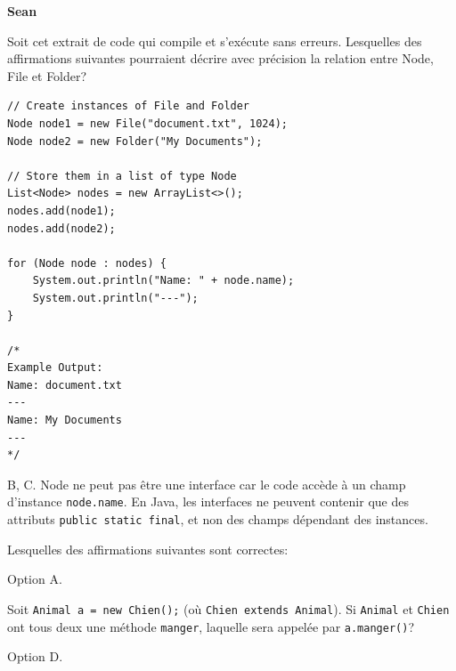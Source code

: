 \begin{Exercice}[5 minutes]\textbf{Sean}


Soit cet extrait de code qui compile et s'exécute sans erreurs. Lesquelles des affirmations suivantes pourraient décrire avec précision la relation entre Node, File et Folder?

\begin{lstlisting}[style=javastyle]
// Create instances of File and Folder
Node node1 = new File("document.txt", 1024);
Node node2 = new Folder("My Documents");

// Store them in a list of type Node
List<Node> nodes = new ArrayList<>();
nodes.add(node1);
nodes.add(node2);

for (Node node : nodes) {
    System.out.println("Name: " + node.name); 
    System.out.println("---");
}

/*
Example Output:
Name: document.txt
---
Name: My Documents
---
*/
\end{lstlisting}


\begin{solution}
B, C. Node ne peut pas être une interface car le code accède à un champ d’instance \texttt{node.name}. 
En Java, les interfaces ne peuvent contenir que des attributs \texttt{public static final}, et non des champs dépendant des instances.
\end{solution}

Lesquelles des affirmations suivantes sont correctes:


\begin{solution}
Option A. 
\end{solution}

Soit \texttt{Animal a = new Chien();} (où \texttt{Chien extends Animal}). Si \texttt{Animal} et \texttt{Chien} ont tous deux une méthode \texttt{manger}, laquelle sera appelée par 
\texttt{a.manger()}?


\begin{solution}
Option D.
\end{solution}

\end{Exercice}

